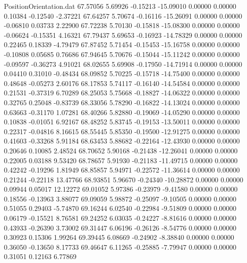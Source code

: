 \begin{filecontents}{PositionOrientation.dat}
  67.57056    5.69926   -0.15213   -15.09010    0.00000    0.00000    0.10384   -0.12540   -2.37221
  67.64257    5.70674   -0.16116   -15.26091    0.00000    0.00000   -0.06810    0.03733    2.22900
  67.72238    5.70130   -0.15818   -15.08300    0.00000    0.00000   -0.06624   -0.15351    4.16321
  67.79437    5.69653   -0.16923   -14.78329    0.00000    0.00000    0.22465    0.18339   -4.79479
  67.87452    5.71454   -0.15453   -15.16758    0.00000    0.00000   -0.10808    0.05685    0.76686
  67.94645    5.70676   -0.15044   -15.11242    0.00000    0.00000   -0.09597   -0.36273    4.91021
  68.02655    5.69908   -0.17950   -14.71914    0.00000    0.00000    0.04410    0.31010   -0.48434
  68.09852    5.70225   -0.15718   -14.75400    0.00000    0.00000    0.48648   -0.05273    2.60176
  68.17853    5.74117   -0.16140   -14.54584    0.00000    0.00000    0.21531   -0.37319    6.70289
  68.25053    5.75668   -0.18827   -14.06322    0.00000    0.00000    0.32765    0.25048   -0.83739
  68.33056    5.78290   -0.16822   -14.13024    0.00000    0.00000    0.63663   -0.31170    1.07281
  68.40266    5.82880   -0.19069   -14.05290    0.00000    0.00000    0.10838   -0.01051    6.92167
  68.48252    5.83745   -0.19153   -13.50011    0.00000    0.00000    0.22317   -0.04816    8.16615
  68.55445    5.85350   -0.19500   -12.91275    0.00000    0.00000    0.41603   -0.33268    5.91184
  68.63453    5.88682   -0.22164   -12.43930    0.00000    0.00000    0.20646    0.10085    2.48524
  68.70652    5.90168   -0.21438   -12.26041    0.00000    0.00000    0.22005    0.03188    9.53420
  68.78657    5.91930   -0.21183   -11.49715    0.00000    0.00000    0.42242   -0.19296    1.81949
  68.85857    5.94971   -0.22572   -11.36614    0.00000    0.00000    0.21244   -0.22118   13.47766
  68.93851    5.96670   -0.24340   -10.28872    0.00000    0.00000    0.09944    0.05017   12.12272
  69.01052    5.97386   -0.23979    -9.41580    0.00000    0.00000    0.18556   -0.13963    3.88077
  69.09059    5.98872   -0.25097    -9.10505    0.00000    0.00000    0.51055    0.29403   -5.74870
  69.16244    6.02540   -0.22984    -9.51809    0.00000    0.00000    0.06179   -0.15521    8.76581
  69.24252    6.03035   -0.24227    -8.81616    0.00000    0.00000    0.43933   -0.26390    3.73002
  69.31447    6.06196   -0.26126    -8.54776    0.00000    0.00000    0.30923    0.15306    1.99264
  69.39445    6.08669   -0.24902    -8.38840    0.00000    0.00000    0.36050   -0.13650    8.17733
  69.46647    6.11265   -0.25885    -7.79947    0.00000    0.00000    0.31051    0.12163    6.77869

\end{filecontents}
